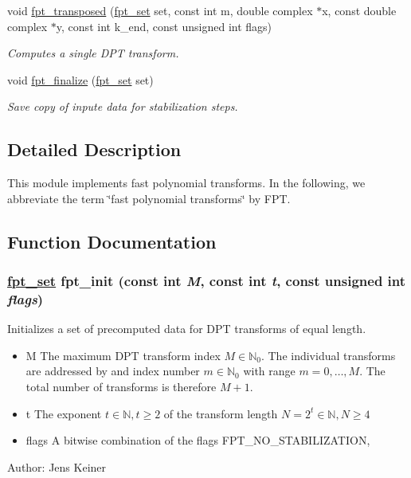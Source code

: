 \begin{CompactItemize}
void \hyperlink{group__fpt_ga6}{fpt\_\-transposed} (\hyperlink{structfpt__set__s__}{fpt\_\-set} set, const int m, double complex $\ast$x, const double complex $\ast$y, const int k\_\-end, const unsigned int flags)
\begin{CompactList}\small\item\em Computes a single DPT transform. \item\end{CompactList}\item 
\hypertarget{group__fpt_ga7}{
void \hyperlink{group__fpt_ga7}{fpt\_\-finalize} (\hyperlink{structfpt__set__s__}{fpt\_\-set} set)}
\label{group__fpt_ga7}

\begin{CompactList}\small\item\em Save copy of inpute data for stabilization steps. \item\end{CompactList}\end{CompactItemize}


\subsection{Detailed Description}
This module implements fast polynomial transforms. In the following, we abbreviate the term \char`\"{}fast polynomial transforms\char`\"{} by FPT. 

\subsection{Function Documentation}
\hypertarget{group__fpt_ga1}{
\subsubsection[fpt\_\-init]{\setlength{\rightskip}{0pt plus 5cm}\hyperlink{structfpt__set__s__}{fpt\_\-set} fpt\_\-init (const int {\em M}, const int {\em t}, const unsigned int {\em flags})}}
\label{group__fpt_ga1}


Initializes a set of precomputed data for DPT transforms of equal length. 

\begin{itemize}
\item M The maximum DPT transform index $M \in \mathbb{N}_0$. The individual transforms are addressed by and index number $m \in \mathbb{N}_0$ with range $m = 0,\ldots,M$. The total number of transforms is therefore $M+1$. \item t The exponent $t \in \mathbb{N}, t \ge 2$ of the transform length $N = 2^t \in \mathbb{N}, N \ge 4$ \item flags A bitwise combination of the flags FPT\_\-NO\_\-STABILIZATION,\end{itemize}
\begin{Desc}
\item[Author:]Jens Keiner \end{Desc}


